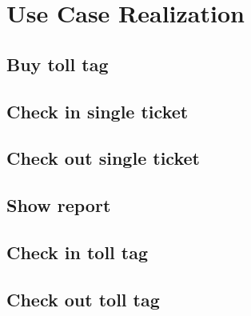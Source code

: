 \section {Use Case Realization}

\subsection{Buy toll tag}

\subsection{Check in single ticket}

\subsection{Check out single ticket}

\subsection{Show report}

\subsection{Check in toll tag}

\subsection{Check out toll tag}

